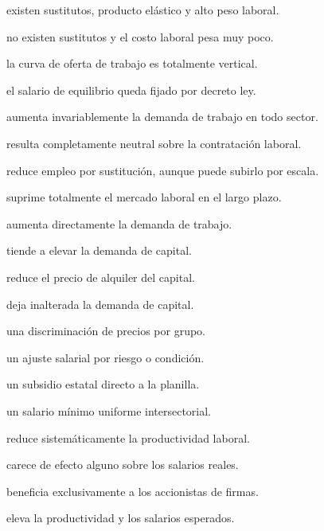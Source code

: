 \begin{opts}
    \item existen sustitutos, producto elástico y alto peso laboral.
    \item no existen sustitutos y el costo laboral pesa muy poco.
    \item la curva de oferta de trabajo es totalmente vertical.
    \item el salario de equilibrio queda fijado por decreto ley.
\end{opts}

\begin{opts}
    \item aumenta invariablemente la demanda de trabajo en todo sector.
    \item resulta completamente neutral sobre la contratación laboral.
    \item reduce empleo por sustitución, aunque puede subirlo por escala.
    \item suprime totalmente el mercado laboral en el largo plazo.
\end{opts}

\begin{opts}
    \item aumenta directamente la demanda de trabajo.
    \item tiende a elevar la demanda de capital.
    \item reduce el precio de alquiler del capital.
    \item deja inalterada la demanda de capital.
\end{opts}

\begin{opts}
    \item una discriminación de precios por grupo.
    \item un ajuste salarial por riesgo o condición.
    \item un subsidio estatal directo a la planilla.
    \item un salario mínimo uniforme intersectorial.
\end{opts}

\begin{opts}
    \item reduce sistemáticamente la productividad laboral.
    \item carece de efecto alguno sobre los salarios reales.
    \item beneficia exclusivamente a los accionistas de firmas.
    \item eleva la productividad y los salarios esperados.
\end{opts}

